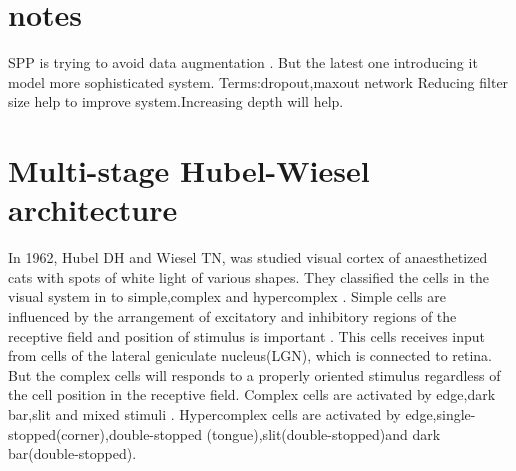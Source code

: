 \documentclass{article}
\begin{document}
\section{notes}
SPP is trying to avoid data augmentation . But the latest one introducing it model more sophisticated system.
Terms:dropout,maxout network
Reducing filter size help to improve system.Increasing depth will help. 
\section{Multi-stage Hubel-Wiesel architecture}
In 1962, Hubel DH and Wiesel TN\cite{Hubel1962},\cite{Hubel1965a} was studied visual cortex of anaesthetized cats  with   spots of white light of various shapes. They classified the  cells in the visual system in to  simple,complex and hypercomplex . Simple cells are influenced  by the arrangement of  excitatory and inhibitory regions of the receptive field and  position of stimulus is important . This cells receives input from cells of the lateral geniculate nucleus(LGN), which is connected to retina. But the complex cells will responds to  a properly  oriented stimulus regardless of the cell position in the receptive field. Complex cells are activated by edge,dark bar,slit and mixed stimuli . Hypercomplex cells are activated by edge,single-stopped(corner),double-stopped (tongue),slit(double-stopped)and dark bar(double-stopped).
\end{document}
